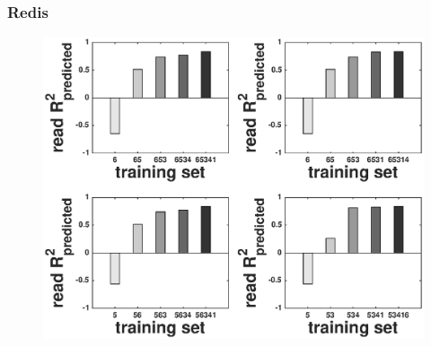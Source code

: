 \documentclass{beamer}
\begin{document}
\begin{frame}
\begin{table}
\end{table}
\end{frame}

\begin{frame}
\frametitle{Redis}
  \begin{figure}
    \centering
    \includegraphics[scale = 0.4]{bar_read_avg_latency.eps}
  \end{figure}
\end{frame}
\end{document}
